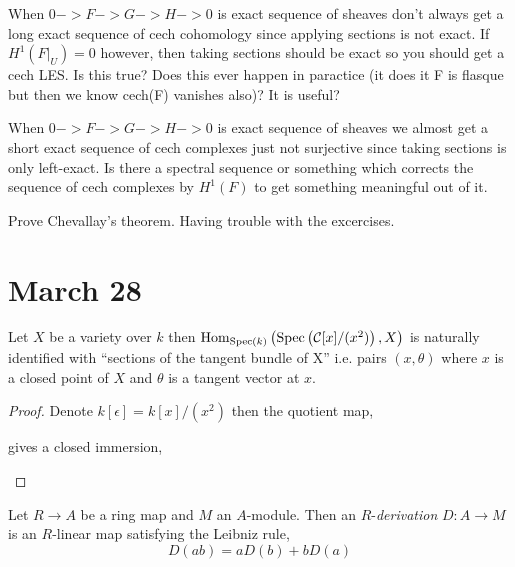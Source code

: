\documentclass[12pt]{article}
\begin{document}
When $0 -> F -> G -> H -> 0$ is exact sequence of sheaves don't always get a long exact sequence of cech cohomology since applying sections is not exact. If $H^1(F|_U) = 0$ however, then taking sections should be exact so you should get a cech LES. Is this true? Does this ever happen in paractice (it does it F is flasque but then we know cech(F) vanishes also)? It is useful? 

When $0 -> F -> G -> H -> 0$ is exact sequence of sheaves we almost get a short exact sequence of cech complexes just not surjective since taking sections is only left-exact. Is there a spectral sequence or something which corrects the sequence of cech complexes by $H^1(F)$ to get something meaningful out of it. 

Prove Chevallay's theorem. Having trouble with the excercises. 


\section{March 28}

\begin{proposition}
Let $X$ be a variety over $k$ then $\mathrm{Hom}_{\mathrm{Spec}\left( k \right)} \left( \mathrm{Spec}\left( \mathcal{C}[x]/(x^2) \right), X \right)$ is naturally identified with ``sections of the tangent bundle of X'' i.e. pairs $(x, \theta)$ where $x$ is a closed point of $X$ and $\theta$ is a tangent vector at $x$.
\end{proposition}

\begin{proof}
Denote $k[\epsilon] = k[x]/(x^2)$ then the quotient map,
\begin{center}
\end{center}
gives a closed immersion,
\begin{center}
\end{center}
\end{proof}

\begin{definition}
Let $R \to A$ be a ring map and $M$ an $A$-module. Then an $R$-\textit{derivation} $D : A \to M$ is an $R$-linear map satisfying the Leibniz rule,
\[ D(ab) = a D(b) + b D(a) \] 
\end{definition}
\end{document}
